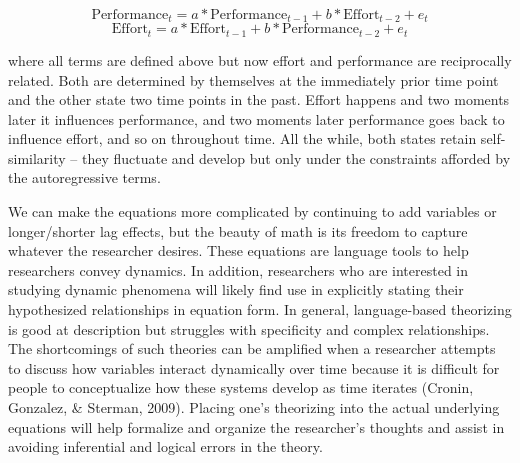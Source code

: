 \documentclass[english,,man]{apa6}
\theoremstyle{definition}
\theoremstyle{definition}
\theoremstyle{definition}
\theoremstyle{remark}
\begin{document}
\begin{equation}
\label{sysy3}
\textrm{Performance}_{t} = a * \textrm{Performance}_{t - 1} + b * \textrm{Effort}_{t - 2} + e_{t}
\end{equation} \begin{equation}
\label{sysx3}
\textrm{Effort}_{t} = a * \textrm{Effort}_{t - 1} + b * \textrm{Performance}_{t - 2} + e_{t}
\end{equation}

\noindent where all terms are defined above but now effort and
performance are reciprocally related. Both are determined by themselves
at the immediately prior time point and the other state two time points
in the past. Effort happens and two moments later it influences
performance, and two moments later performance goes back to influence
effort, and so on throughout time. All the while, both states retain
self-similarity -- they fluctuate and develop but only under the
constraints afforded by the autoregressive terms.

We can make the equations more complicated by continuing to add
variables or longer/shorter lag effects, but the beauty of math is its
freedom to capture whatever the researcher desires. These equations are
language tools to help researchers convey dynamics. In addition,
researchers who are interested in studying dynamic phenomena will likely
find use in explicitly stating their hypothesized relationships in
equation form. In general, language-based theorizing is good at
description but struggles with specificity and complex relationships.
The shortcomings of such theories can be amplified when a researcher
attempts to discuss how variables interact dynamically over time because
it is difficult for people to conceptualize how these systems develop as
time iterates (Cronin, Gonzalez, \& Sterman, 2009). Placing one's
theorizing into the actual underlying equations will help formalize and
organize the researcher's thoughts and assist in avoiding inferential
and logical errors in the theory.
\end{document}
